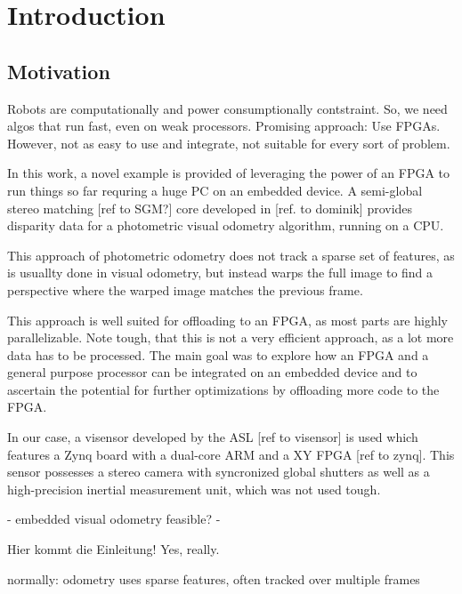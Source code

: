 \chapter{Introduction}
\label{sec:introduction}

\section{Motivation}
\label{sec:motivation}

Robots are computationally and power consumptionally contstraint. So, we need
algos that run fast, even on weak processors. Promising approach: Use FPGAs.
However, not as easy to use and integrate, not suitable for every sort of
problem.

In this work, a novel example is provided of leveraging the power of an FPGA to
run things so far requring a huge PC on an embedded device. A semi-global
stereo matching [ref to SGM?] core developed in [ref. to dominik] provides
disparity data for a photometric visual odometry algorithm, running on a CPU.

This approach of photometric odometry does not track a sparse set of features,
as is usuallty done in visual odometry, but instead warps the full image to
find a perspective where the warped image matches the previous frame.

This approach is well suited for offloading to an FPGA, as most parts are
highly parallelizable. Note tough, that this is not a very efficient approach,
as a lot more data has to be processed. The main goal was to explore how an
FPGA and a general purpose processor can be integrated on an embedded device
and to ascertain the potential for further optimizations by offloading more
code to the FPGA.

In our case, a visensor developed by the ASL [ref to visensor] is used which
features a Zynq board with a dual-core ARM and a XY FPGA [ref to zynq]. This
sensor possesses a stereo camera with syncronized global shutters as
well as a high-precision inertial measurement unit, which was not used tough.






- embedded visual odometry feasible?
- 






Hier kommt die Einleitung! Yes, really.

normally: odometry uses sparse features, often tracked over multiple frames


